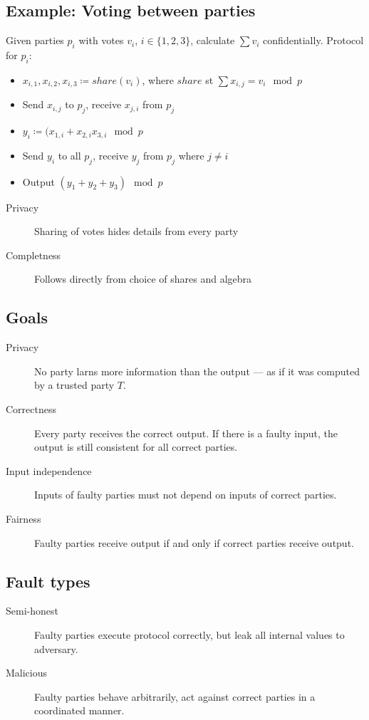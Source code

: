 \subsection{Example: Voting between parties}

Given parties $p_i$ with votes $v_i$, $i \in \{1, 2, 3\}$, calculate $\sum v_i$
confidentially. Protocol for $p_i$:
\begin{itemize}
		\item $x_{i,1}, x_{i, 2}, x_{i, 3} \coloneqq share(v_i)$, where $share$
				st $\sum x_{i, j} = v_i \mod p$
		\item Send $x_{i,j}$ to $p_j$, receive $x_{j, i}$ from $p_j$
		\item $y_i \coloneqq (x_{1, i} + x_{2, i} x_{3, i} \mod p$
		\item Send $y_i$ to all $p_j$, receive $y_j$ from $p_j$ where $j \neq i$
		\item Output $(y_1 + y_2 + y_3) \mod p$
\end{itemize}

\begin{description}
		\item[Privacy] Sharing of votes hides details from every party
		\item[Completness] Follows directly from choice of shares and algebra
\end{description}

\subsection{Goals}

\begin{description}
		\item[Privacy] No party larns more information than the output --- as
				if it was computed by a trusted party $T$.
		\item[Correctness] Every party receives the correct output. If there is
				a faulty input, the output is still consistent for all correct
				parties.
		\item[Input independence] Inputs of faulty parties must not depend on
				inputs of correct parties.
		\item[Fairness] Faulty parties receive output if and only if correct
				parties receive output.
\end{description}

\subsection{Fault types}

\begin{description}
		\item[Semi-honest] Faulty parties execute protocol correctly, but leak
				all internal values to adversary.
		\item[Malicious] Faulty parties behave arbitrarily, act against correct
				parties in a coordinated manner.
\end{description}
